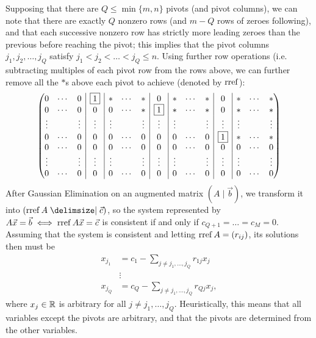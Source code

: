 \documentclass[main.tex]{subfiles}
\begin{document}
Supposing that there are $Q\le \min\{m, n\}$ pivots (and pivot columns), we can note that there are exactly $Q$ nonzero rows (and $m - Q$ rows of zeroes following), and that each successive nonzero row has strictly more leading zeroes than the previous before reaching the pivot; this implies that the pivot columns $j_1, j_2, \ldots , j_Q$ satisfy $j_1 < j_2 < \ldots < j_Q\le n$. Using further row operations (i.e. subtracting multiples of each pivot row from the rows above, we can further remove all the $*$s above each pivot to achieve  (denoted by $\operatorname{rref}$):
\[\left(\begin{array}{@{}c c c | c | c c c | c | c c c | c | c c c@{}}
    0 & \cdots & 0 & \boxed{1} & * & \cdots & * & 0 & * & \cdots & * & 0 & * & \cdots & *  \\
    0 & \cdots & 0 & 0 & 0 & \cdots & * & \boxed{1} & * & \cdots & * & 0 & * & \cdots & *  \\
    \vdots & & \vdots & \vdots & \vdots & & \vdots & \vdots & \vdots & & \vdots & \vdots & \vdots & & \vdots \\
    0 & \cdots & 0 & 0 & 0 & \cdots & 0 & 0 & 0 & \cdots & 0 & \boxed{1} & * & \cdots & *  \\
    0 & \cdots & 0 & 0 & 0 & \cdots & 0 & 0 & 0 & \cdots & 0 & 0 & 0 & \cdots & 0  \\
    \vdots & & \vdots & \vdots & \vdots & & \vdots & \vdots & \vdots & & \vdots & \vdots & \vdots & & \vdots \\
    0 & \cdots & 0 & 0 & 0 & \cdots & 0 & 0 & 0 & \cdots & 0 & 0 & 0 & \cdots & 0
\end{array}\right)\]
After Gaussian Elimination on an augmented matrix $(A\mid \vec{b})$, we transform it into $(\rref A\mid \vec{c})$, so the system represented by $A\vec{x} = \vec{b}\iff \operatorname{rref} A\vec{x} = \vec{c}$ is consistent if and only if $c_{Q + 1} = \ldots = c_M = 0$. Assuming that the system is consistent and letting $\operatorname{rref} A = (r_{ij})$, its solutions then must be
\begin{align*}
    x_{j_1} &= c_1 - \sum_{j \neq j_1, \ldots , j_Q} r_{1j}x_j \\
    &\vdots \\
    x_{j_Q} &= c_Q - \sum_{j\neq j_1, \ldots , j_Q} r_{Qj}x_j,
\end{align*}
where $x_j\in \mathbb R$ is arbitrary for all $j\neq j_1, \ldots , j_Q$. Heuristically, this means that all variables except the pivots are arbitrary, and that the pivots are determined from the other variables.
\end{document}
